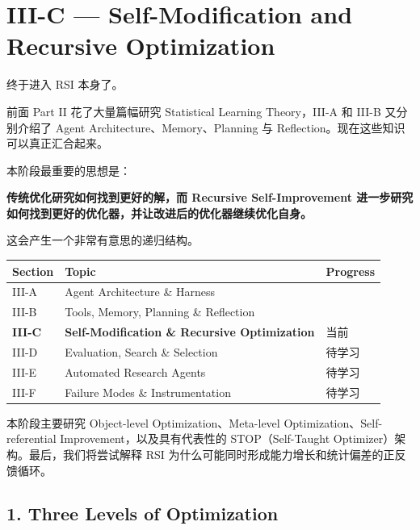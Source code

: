 \hypertarget{part-3-37-0001-iii-c-self-modification-and-recursive-optimization}{%
\section{III-C --- Self-Modification and Recursive Optimization}\label{part-3-37-0001-iii-c-self-modification-and-recursive-optimization}}

终于进入 RSI 本身了。

前面 Part II 花了大量篇幅研究 Statistical Learning Theory，III-A 和 III-B 又分别介绍了 Agent Architecture、Memory、Planning 与 Reflection。现在这些知识可以真正汇合起来。

本阶段最重要的思想是：

\textbf{传统优化研究如何找到更好的解，而 Recursive Self-Improvement 进一步研究如何找到更好的优化器，并让改进后的优化器继续优化自身。}

这会产生一个非常有意思的递归结构。

\begin{readertable}
\begin{longtable}[]{@{}
  >{\raggedright\arraybackslash}p{}
  >{\raggedright\arraybackslash}p{}
  >{\raggedright\arraybackslash}p{}@{}}
\toprule
Section & Topic & Progress \\
\midrule
\endhead
III-A & Agent Architecture \& Harness & \\
III-B & Tools, Memory, Planning \& Reflection & \\
\textbf{III-C} & \textbf{Self-Modification \& Recursive Optimization} & 当前 \\
III-D & Evaluation, Search \& Selection & 待学习 \\
III-E & Automated Research Agents & 待学习 \\
III-F & Failure Modes \& Instrumentation & 待学习 \\
\bottomrule
\end{longtable}
\end{readertable}

本阶段主要研究 Object-level Optimization、Meta-level Optimization、Self-referential Improvement，以及具有代表性的 STOP（Self-Taught Optimizer）架构。最后，我们将尝试解释 RSI 为什么可能同时形成能力增长和统计偏差的正反馈循环。

\hypertarget{part-3-37-0001-three-levels-of-optimization}{%
\subsection{1. Three Levels of Optimization}\label{part-3-37-0001-three-levels-of-optimization}}

